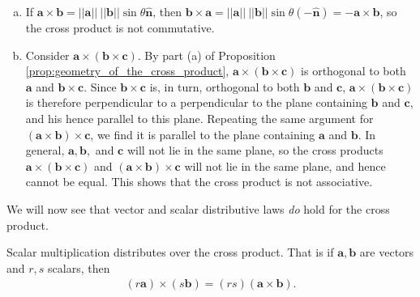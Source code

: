 \documentclass[12pt,letterpaper,reqno]{article}
\numberwithin{equation}{section}
\newcommand{\fixme}[1]{{\color{orange}{[#1]}}}
\begin{document}
\begin{remark} \hspace{15cm}
\begin{enumerate}[(a)]
	\item If $\mathbf{a} \times \mathbf{b}=||\mathbf{a}||\ ||\mathbf{b}||\sin\theta \mathbf{\hat{n}}$, then $\mathbf{b} \times \mathbf{a}=||\mathbf{a}||\ ||\mathbf{b}||\sin\theta \mathbf{(-\hat{n})}=-\mathbf{a} \times \mathbf{b}$, so the cross product is not commutative.
	\item Consider $\mathbf{a} \times (\mathbf{b} \times \mathbf{c})$. By part (a) of Proposition \ref{prop:geometry_of_the_cross_product}, $\mathbf{a} \times (\mathbf{b} \times \mathbf{c})$ is orthogonal to both $\mathbf{a}$ and $\mathbf{b} \times \mathbf{c}$. Since $\mathbf{b} \times \mathbf{c}$ is, in turn, orthogonal to both $\mathbf{b}$ and $\mathbf{c}$, $\mathbf{a} \times (\mathbf{b} \times \mathbf{c})$ is therefore perpendicular to a perpendicular to the plane containing $\mathbf{b}$ and $\mathbf{c}$, and his hence parallel to this plane. \fixme{Insert figure.} Repeating the same argument for $(\mathbf{a} \times \mathbf{b}) \times \mathbf{c}$, we find it is parallel to the plane containing $\mathbf{a}$ and $\mathbf{b}$. In general, $\mathbf{a}, \mathbf{b},$ and $\mathbf{c}$ will not lie in the same plane, so the cross products $\mathbf{a} \times (\mathbf{b} \times \mathbf{c})$ and  $(\mathbf{a} \times \mathbf{b}) \times \mathbf{c}$ will not lie in the same plane, and hence cannot be equal. This shows that the cross product is not associative.
\end{enumerate}
\end{remark}
We will now see that vector and scalar distributive laws \emph{do} hold for the cross product.
\begin{prop}\label{prop:scalar_distributive_law}
	Scalar multiplication distributes over the cross product. That is if $\mathbf{a},\mathbf{b}$ are vectors and $r,s$ scalars, then
	\begin{align*}
		(r\mathbf{a}) \times (s\mathbf{b})=(rs)(\mathbf{a} \times \mathbf{b}).
	\end{align*} 
\end{prop}
\end{document}
